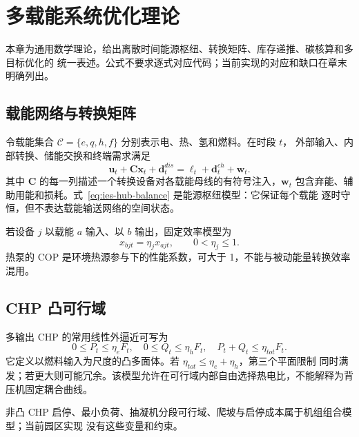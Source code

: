 \section{多载能系统优化理论}

\begin{theorynote}
本章为通用数学理论，给出离散时间能源枢纽、转换矩阵、库存递推、碳核算和多目标优化的
统一表述。公式不要求逐式对应代码；当前实现的对应和缺口在章末明确列出。
\end{theorynote}

\subsection{载能网络与转换矩阵}

令载能集合 $\mathcal C=\{e,q,h,f\}$ 分别表示电、热、氢和燃料。在时段 $t$，
外部输入、内部转换、储能交换和终端需求满足
\begin{equation}
\mathbf u_t+\mathbf C\mathbf x_t+\mathbf d_t^{dis}
=\boldsymbol\ell_t+\mathbf d_t^{ch}+\mathbf w_t.
\label{eq:ies-hub-balance}
\end{equation}
其中 $\mathbf C$ 的每一列描述一个转换设备对各载能母线的有符号注入，$\mathbf w_t$
包含弃能、辅助用能和损耗。式~\eqref{eq:ies-hub-balance} 是能源枢纽模型：它保证每个载能
逐时守恒，但不表达载能输送网络的空间状态。

若设备 $j$ 以载能 $a$ 输入、以 $b$ 输出，固定效率模型为
\begin{equation}
x_{bjt}=\eta_jx_{ajt},\qquad 0<\eta_j\le1.
\end{equation}
热泵的 COP 是环境热源参与下的性能系数，可大于 1，不能与被动能量转换效率混用。

\subsection{CHP 凸可行域}

多输出 CHP 的常用线性外逼近可写为
\begin{equation}
0\le P_t\le\eta_e F_t,\quad
0\le Q_t\le\eta_h F_t,\quad
P_t+Q_t\le\eta_{tot}F_t.
\label{eq:ies-chp-envelope}
\end{equation}
它定义以燃料输入为尺度的凸多面体。若 $\eta_{tot}\le\eta_e+\eta_h$，第三个平面限制
同时满发；若更大则可能冗余。该模型允许在可行域内部自由选择热电比，不能解释为背压机固定耦合曲线。

\begin{gapnote}
非凸 CHP 启停、最小负荷、抽凝机分段可行域、爬坡与启停成本属于机组组合模型；当前园区实现
没有这些变量和约束。
\end{gapnote}

